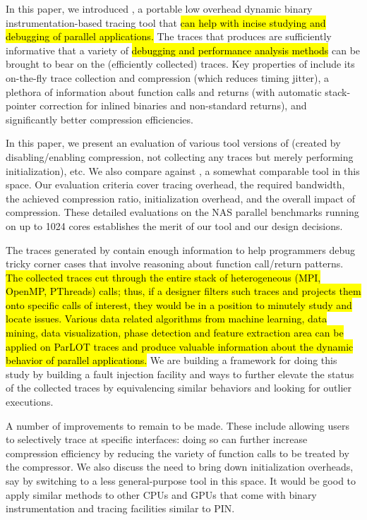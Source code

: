 
In this paper, we introduced \parlot, a portable low overhead dynamic
binary instrumentation-based
tracing tool that \hl{can help with incise studying and debugging of parallel applications.}
%
The traces that \parlot produces are sufficiently informative that
a variety of \hl{debugging and performance analysis methods} can be brought to bear on the
(efficiently collected) traces.
%
Key properties of \parlot include its on-the-fly trace collection and
compression (which reduces timing jitter), a plethora of information
about function calls and returns (with automatic stack-pointer 
correction for inlined binaries and non-standard returns), and
significantly better compression efficiencies.
%

In this paper, we present an evaluation of various tool versions of \parlot
(created by disabling/enabling compression, not collecting any traces but
merely performing initialization), etc.
%
We also compare \parlot against \callgrind, a somewhat comparable tool
in this space.
%
Our evaluation criteria cover tracing overhead, the required bandwidth,
the achieved compression ratio, initialization overhead, and the 
overall impact of compression.
%
These detailed evaluations on the NAS parallel benchmarks running on
up to 1024 cores establishes the merit of our tool and our design
decisions.

The traces generated by
\parlot  contain enough information to help programmers debug
tricky corner cases that involve reasoning about function call/return
patterns.
%
\hl{
The collected traces cut through the entire stack of heterogeneous
(MPI, OpenMP, PThreads) calls; thus, if a designer filters such traces
and projects them onto specific calls of interest, they would be in 
a position to minutely study and locate issues. Various data related algorithms from machine learning, data mining, data visualization, phase detection and feature extraction area can be applied on ParLOT traces and produce valuable information about the dynamic behavior of parallel applications.
}
We are  building a framework for doing this study by building
a fault injection facility and ways to further elevate the
status of the collected traces by equivalencing similar behaviors
and looking for outlier executions.


A number of improvements to \parlot remain to be made.
%
These include allowing users to selectively trace at specific
interfaces: doing so can further increase compression efficiency
by reducing the variety of function calls to be treated by
the compressor.
%
We also discuss the need to bring down initialization overheads, say
by switching to a less general-purpose tool in this space.
%
It would be good to apply similar methods to
other CPUs and GPUs that come with binary instrumentation and tracing
facilities similar to PIN.

